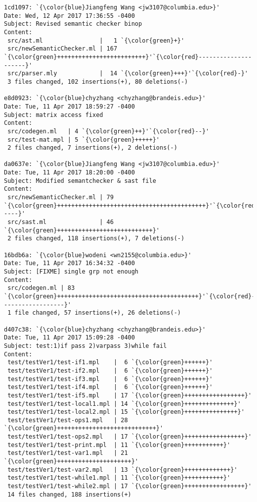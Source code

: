 \begin{lstlisting}
1cd1097: `{\color{blue}Jiangfeng Wang <jw3107@columbia.edu>}'
Date: Wed, 12 Apr 2017 17:36:55 -0400
Subject: Revised semantic checker binop
Content: 
 src/ast.ml                |   1 `{\color{green}+}'
 src/newSemanticChecker.ml | 167 `{\color{green}+++++++++++++++++++++++++}'`{\color{red}---------------------}'
 src/parser.mly            |  14 `{\color{green}+++}'`{\color{red}-}'
 3 files changed, 102 insertions(+), 80 deletions(-)

e8d0923: `{\color{blue}chyzhang <chyzhang@brandeis.edu>}'
Date: Tue, 11 Apr 2017 18:59:27 -0400
Subject: matrix access fixed
Content: 
 src/codegen.ml   | 4 `{\color{green}++}'`{\color{red}--}'
 src/test-mat.mpl | 5 `{\color{green}+++++}'
 2 files changed, 7 insertions(+), 2 deletions(-)

da0637e: `{\color{blue}Jiangfeng Wang <jw3107@columbia.edu>}'
Date: Tue, 11 Apr 2017 18:20:00 -0400
Subject: Modified semantchecker & sast file
Content: 
 src/newSemanticChecker.ml | 79 `{\color{green}++++++++++++++++++++++++++++++++++++++++++}'`{\color{red}-----}'
 src/sast.ml               | 46 `{\color{green}+++++++++++++++++++++++++++}'
 2 files changed, 118 insertions(+), 7 deletions(-)

16bdb6a: `{\color{blue}wodeni <wn2155@columbia.edu>}'
Date: Tue, 11 Apr 2017 16:34:32 -0400
Subject: [FIXME] single grp not enough
Content: 
 src/codegen.ml | 83 `{\color{green}++++++++++++++++++++++++++++++++++++++++}'`{\color{red}------------------}'
 1 file changed, 57 insertions(+), 26 deletions(-)

d407c38: `{\color{blue}chyzhang <chyzhang@brandeis.edu>}'
Date: Tue, 11 Apr 2017 15:09:28 -0400
Subject: test:1)if pass 2)varpass 3)while fail
Content: 
 test/testVer1/test-if1.mpl    |  6 `{\color{green}++++++}'
 test/testVer1/test-if2.mpl    |  6 `{\color{green}++++++}'
 test/testVer1/test-if3.mpl    |  6 `{\color{green}++++++}'
 test/testVer1/test-if4.mpl    |  6 `{\color{green}++++++}'
 test/testVer1/test-if5.mpl    | 17 `{\color{green}+++++++++++++++++}'
 test/testVer1/test-local1.mpl | 14 `{\color{green}++++++++++++++}'
 test/testVer1/test-local2.mpl | 15 `{\color{green}+++++++++++++++}'
 test/testVer1/test-ops1.mpl   | 28 `{\color{green}++++++++++++++++++++++++++++}'
 test/testVer1/test-ops2.mpl   | 17 `{\color{green}+++++++++++++++++}'
 test/testVer1/test-print.mpl  | 11 `{\color{green}+++++++++++}'
 test/testVer1/test-var1.mpl   | 21 `{\color{green}+++++++++++++++++++++}'
 test/testVer1/test-var2.mpl   | 13 `{\color{green}+++++++++++++}'
 test/testVer1/test-while1.mpl | 11 `{\color{green}+++++++++++}'
 test/testVer1/test-while2.mpl | 17 `{\color{green}+++++++++++++++++}'
 14 files changed, 188 insertions(+)


\end{lstlisting}
